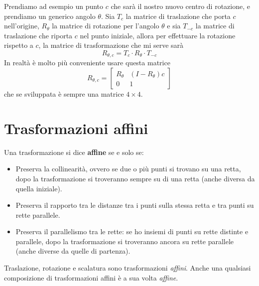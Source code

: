 Prendiamo ad esempio un punto $c$ che sar\`a il nostro nuovo centro di rotazione, e prendiamo
un generico angolo $\theta$. Sia $T_c$ la matrice di traslazione che porta $c$ nell'origine,
$R_\theta$ la matrice di rotazione per l'angolo $\theta$ e sia $T_{-c}$ la matrice di
traslazione che riporta $c$ nel punto iniziale, allora per effettuare la rotazione rispetto
a $c$, la matrice di trasformazione che mi serve sar\`a
\[ R_{\theta, c} = T_c \cdot R_\theta \cdot T_{-c} \]
In realt\`a \`e molto pi\`u conveniente usare questa matrice
\[
	R_{\theta, c} = \begin{bmatrix}
		R_\theta & (I - R_\theta) c \\
		0        & 1
	\end{bmatrix}
\]
che se sviluppata \`e sempre una matrice $4 \times 4$.

\section{Trasformazioni affini}
Una trasformazione si dice \textbf{affine} se e solo se:
\begin{itemize}
	\item Preserva la collinearit\`a, ovvero se due o pi\`u punti si trovano su una retta,
	      dopo la trasformazione si troveranno sempre su di una retta (anche diversa da
	      quella iniziale).
	\item Preserva il rapporto tra le distanze tra i punti sulla stessa retta e tra punti su
	      rette parallele.
	\item Preserva il parallelismo tra le rette: se ho insiemi di punti su rette distinte e
	      parallele, dopo la trasformazione si troveranno ancora su rette parallele (anche
	      diverse da quelle di partenza).
\end{itemize}
Traslazione, rotazione e scalatura sono trasformazioni \emph{affini}. Anche una qualsiasi
composizione di trasformazioni affini \`e a sua volta \emph{affine}.

